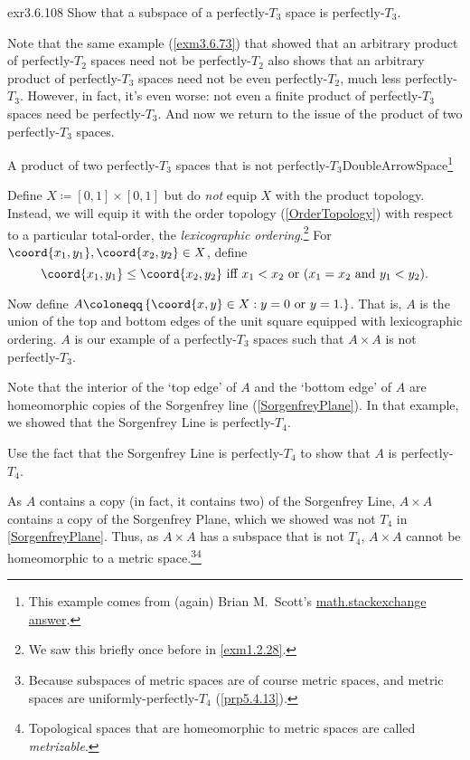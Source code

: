 \begin{exr}{}{exr3.6.108}
Show that a subspace of a perfectly-$T_3$ space is perfectly-$T_3$.
\end{exr}
Note that the same example (\cref{exm3.6.73}) that showed that an arbitrary product of perfectly-$T_2$ spaces need not be perfectly-$T_2$ also shows that an arbitrary product of perfectly-$T_3$ spaces need not be even perfectly-$T_2$, much less perfectly-$T_3$.  However, in fact, it's even worse:  not even a finite product of perfectly-$T_3$ spaces need be perfectly-$T_3$.
And now we return to the issue of the product of two perfectly-$T_3$ spaces.
\begin{exm}{A product of two perfectly-$T_3$ spaces that is not perfectly-$T_3$}{DoubleArrowSpace}\footnote{This example comes from (again) Brian M.~Scott's \href{http://math.stackexchange.com/questions/1859028/}{math.stackexchange answer}.}
\forwardref

\noindent
Define $X\coloneqq [0,1]\times [0,1]$ but do \emph{not} equip $X$ with the product topology.  Instead, we will equip it with the order topology (\cref{OrderTopology}) with respect to a particular total-order, the \emph{lexicographic ordering}.\footnote{We saw this briefly once before in \cref{exm1.2.28}.}  For $\coord{x_1,y_1},\coord{x_2,y_2}\in X$, define
\begin{equation}
\coord{x_1,y_1}\leq \coord{x_2,y_2}\text{ iff }x_1<x_2\text{ or }(x_1=x_2\text{ and }y_1<y_2).
\end{equation}

Now define $A\coloneqq \left\{ \coord{x,y}\in X:y=0\text{ or }y=1\text{.}\right\}$.  That is, $A$ is the union of the top and bottom edges of the unit square equipped with lexicographic ordering.  $A$ is our example of a perfectly-$T_3$ spaces such that $A\times A$ is not perfectly-$T_3$.

Note that the interior of the `top edge' of $A$ and the `bottom edge' of $A$ are homeomorphic copies of the Sorgenfrey line (\cref{SorgenfreyPlane}).  In that example, we showed that the Sorgenfrey Line is perfectly-$T_4$.
\begin{exr}{}{}
Use the fact that the Sorgenfrey Line is perfectly-$T_4$ to show that $A$ is perfectly-$T_4$.
\end{exr}

As $A$ contains a copy (in fact, it contains two) of the Sorgenfrey Line, $A\times A$ contains a copy of the Sorgenfrey Plane, which we showed was not $T_4$ in \cref{SorgenfreyPlane}.  Thus, as $A\times A$ has a subspace that is not $T_4$, $A\times A$ cannot be homeomorphic to a metric space.\footnote{Because subspaces of metric spaces are of course metric spaces, and metric spaces are uniformly-perfectly-$T_4$ (\cref{prp5.4.13}).}\footnote{Topological spaces that are homeomorphic to metric spaces are called \emph{metrizable}.}


\end{exm}
